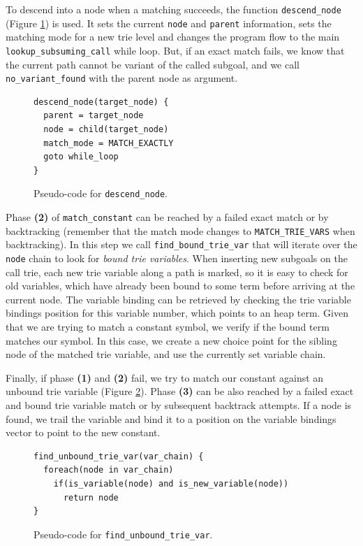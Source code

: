 To descend into a node when a matching succeeds, the function \texttt{descend\_node} (Figure \ref{fig:descend_node})
is used. It sets the current \texttt{node} and \texttt{parent} information, sets the matching mode for a new trie level
and changes the program flow to the main \texttt{lookup\_subsuming\_call} while loop. But,
if an exact match fails, we know that the current path cannot be variant of the called subgoal, and we call
\texttt{no\_variant\_found} with the parent node as argument.

\begin{figure}[ht]
\begin{Verbatim}
descend_node(target_node) {
  parent = target_node
  node = child(target_node)
  match_mode = MATCH_EXACTLY
  goto while_loop
}
\end{Verbatim}
\caption{Pseudo-code for \texttt{descend\_node}.}
\label{fig:descend_node}
\end{figure}

Phase \textbf{(2)} of \texttt{match\_constant} can be reached by a failed exact match or by backtracking
(remember that the match mode changes to \texttt{MATCH\_TRIE\_VARS} when backtracking). In this step
we call \texttt{find\_bound\_trie\_var} that will iterate over the \texttt{node} chain to look for
\textit{bound trie variables}. When inserting new subgoals on the call trie, each new trie variable
along a path is marked, so it is easy to check for old variables, which have already been bound
to some term before arriving at the current node. The variable binding can be retrieved by
checking the trie variable bindings position for this variable number, which points to an heap term.
Given that we are trying to match a constant symbol, we verify if the bound term matches our symbol.
In this case, we create a new choice point for the sibling node of the matched trie variable, and use
the currently set variable chain.

Finally, if phase \textbf{(1)} and \textbf{(2)} fail, we try to match our constant against an unbound trie variable
(Figure \ref{fig:find_unbound_trie_var}).
Phase \textbf{(3)} can be also reached by a failed exact and bound trie variable match or by subsequent backtrack
attempts. If a node is found, we trail the variable and bind it to a position on the variable bindings
vector to point to the new constant.

\begin{figure}[ht]
\begin{Verbatim}
find_unbound_trie_var(var_chain) {
  foreach(node in var_chain)
    if(is_variable(node) and is_new_variable(node))
      return node
}
\end{Verbatim}
\caption{Pseudo-code for \texttt{find\_unbound\_trie\_var}.}
\label{fig:find_unbound_trie_var}
\end{figure}

